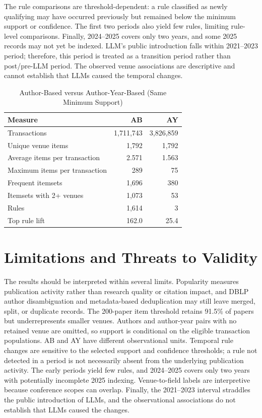 \documentclass[conference]{IEEEtran}
\begin{document}
The rule comparisons are threshold-dependent: a rule classified as newly qualifying may have occurred previously but remained below the minimum support or confidence. The first two periods also yield few rules, limiting rule-level comparisons. Finally, 2024--2025 covers only two years, and some 2025 records may not yet be indexed. LLM's public introduction falls within 2021--2023 period; therefore, this period is treated as a transition period rather than post/pre-LLM period. The observed venue associations are descriptive and cannot establish that LLMs caused the temporal changes.

\begin{table}[t]
\caption{Author-Based versus Author-Year-Based (Same Minimum Support)}
\label{tab:abay}
\centering
\footnotesize
\begin{tabular}{lrr}
\toprule
Measure & AB & AY \\
\midrule
Transactions & 1,711,743 & 3,826,859 \\
Unique venue items & 1,792 & 1,792 \\
Average items per transaction & 2.571 & 1.563 \\
Maximum items per transaction & 289 & 75 \\
Frequent itemsets & 1,696 & 380 \\
Itemsets with 2+ venues & 1,073 & 53 \\
Rules & 1,614 & 3 \\
Top rule lift & 162.0 & 25.4 \\
\bottomrule
\end{tabular}
\end{table}

\section{Limitations and Threats to Validity}
The results should be interpreted within several limits. Popularity measures publication activity rather than research quality or citation impact, and DBLP author disambiguation and metadata-based deduplication may still leave merged, split, or duplicate records. The 200-paper item threshold retains 91.5\% of papers but underrepresents smaller venues. Authors and author-year pairs with no retained venue are omitted, so support is conditional on the eligible transaction populations. AB and AY have different observational units. Temporal rule changes are sensitive to the selected support and confidence thresholds; a rule not detected in a period is not necessarily absent from the underlying publication activity. The early periods yield few rules, and 2024--2025 covers only two years with potentially incomplete 2025 indexing. Venue-to-field labels are interpretive because conference scopes can overlap. Finally, the 2021--2023 interval straddles the public introduction of LLMs, and the observational associations do not establish that LLMs caused the changes.
\end{document}
